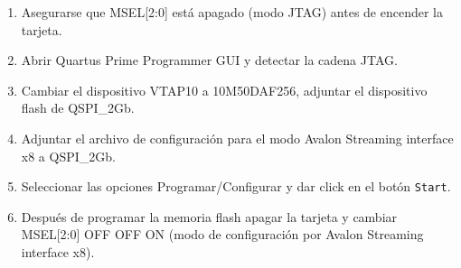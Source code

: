     \begin{enumerate}
        \item Asegurarse que MSEL[2:0] est\'a apagado (modo JTAG) antes de encender la tarjeta.
        \item Abrir Quartus Prime Programmer GUI y detectar la cadena JTAG.
        \item Cambiar el dispositivo VTAP10 a 10M50DAF256, adjuntar el dispositivo flash de QSPI\_2Gb.
        \item Adjuntar el archivo de configuraci\'on para el modo Avalon Streaming interface x8 a QSPI\_2Gb.
        \item Seleccionar las opciones Programar/Configurar y dar click en el bot\'on \texttt{\textcolor{DarkOrchid1}{Start}}.
        \item Despu\'es de programar la memoria flash apagar la tarjeta y cambiar MSEL[2:0] OFF OFF ON (modo de configuraci\'on por Avalon Streaming interface x8).
    \end{enumerate}